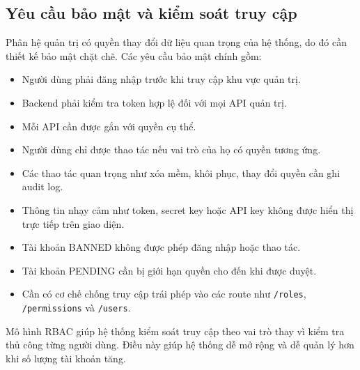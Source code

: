 \subsection{Yêu cầu bảo mật và kiểm soát truy cập}

Phân hệ quản trị có quyền thay đổi dữ liệu quan trọng của hệ thống, do đó cần thiết kế bảo mật chặt chẽ. Các yêu cầu bảo mật chính gồm:

\begin{itemize}
    \item Người dùng phải đăng nhập trước khi truy cập khu vực quản trị.
    \item Backend phải kiểm tra token hợp lệ đối với mọi API quản trị.
    \item Mỗi API cần được gắn với quyền cụ thể.
    \item Người dùng chỉ được thao tác nếu vai trò của họ có quyền tương ứng.
    \item Các thao tác quan trọng như xóa mềm, khôi phục, thay đổi quyền cần ghi audit log.
    \item Thông tin nhạy cảm như token, secret key hoặc API key không được hiển thị trực tiếp trên giao diện.
    \item Tài khoản BANNED không được phép đăng nhập hoặc thao tác.
    \item Tài khoản PENDING cần bị giới hạn quyền cho đến khi được duyệt.
    \item Cần có cơ chế chống truy cập trái phép vào các route như \texttt{/roles}, \texttt{/permissions} và \texttt{/users}.
\end{itemize}

Mô hình RBAC giúp hệ thống kiểm soát truy cập theo vai trò thay vì kiểm tra thủ công từng người dùng. Điều này giúp hệ thống dễ mở rộng và dễ quản lý hơn khi số lượng tài khoản tăng.
